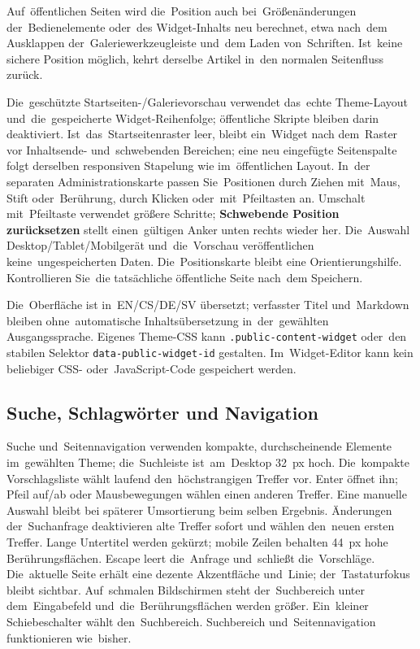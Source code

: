 \documentclass[11pt,a4paper]{article}
\newcommand{\ui}[1]{\textbf{#1}}
\begin{document}
Auf~öffentlichen Seiten wird die~Position auch bei~Größenänderungen
der~Bedienelemente oder~des Widget-Inhalts neu berechnet, etwa nach~dem
Ausklappen der~Galeriewerkzeugleiste und~dem Laden von~Schriften. Ist~keine
sichere Position möglich, kehrt derselbe Artikel in~den normalen Seitenfluss
zurück.

Die~geschützte Startseiten-/Galerievorschau verwendet das~echte Theme-Layout
und~die~gespeicherte Widget-Reihenfolge; öffentliche Skripte bleiben darin
deaktiviert. Ist~das~Startseitenraster leer, bleibt ein~Widget nach dem~Raster
vor Inhaltsende- und~schwebenden Bereichen; eine neu eingefügte Seitenspalte
folgt derselben responsiven Stapelung wie im~öffentlichen Layout. In~der
separaten Administrationskarte passen Sie~Positionen durch Ziehen mit~Maus,
Stift oder~Berührung, durch Klicken oder~mit~Pfeiltasten an. Umschalt
mit~Pfeiltaste verwendet größere Schritte; \ui{Schwebende Position zurücksetzen}
stellt einen~gültigen Anker unten rechts wieder her. Die~Auswahl
Desktop/Tablet/Mobilgerät und~die~Vorschau veröffentlichen keine~ungespeicherten
Daten. Die~Positionskarte bleibt eine Orientierungshilfe. Kontrollieren Sie~die
tatsächliche öffentliche Seite nach~dem Speichern.

Die~Oberfläche ist in~EN/CS/DE/SV übersetzt; verfasster Titel und~Markdown
bleiben ohne~automatische Inhaltsübersetzung in~der~gewählten Ausgangssprache.
Eigenes Theme-CSS kann \texttt{.public-content-widget} oder~den stabilen
Selektor \texttt{data-public-widget-id} gestalten. Im~Widget-Editor kann kein
beliebiger CSS- oder~JavaScript-Code gespeichert werden.


\subsection{Suche, Schlagwörter und Navigation}

Suche und~Seitennavigation verwenden kompakte, durchscheinende Elemente
im~gewählten Theme; die~Suchleiste ist~am~Desktop 32~px hoch.
Die~kompakte Vorschlagsliste wählt laufend den~höchstrangigen Treffer vor.
Enter öffnet ihn; Pfeil auf/ab oder Mausbewegungen wählen einen anderen
Treffer. Eine manuelle Auswahl bleibt bei späterer Umsortierung beim selben
Ergebnis. Änderungen der~Suchanfrage deaktivieren alte Treffer sofort und
wählen den~neuen ersten Treffer. Lange Untertitel werden gekürzt;
mobile Zeilen behalten 44~px hohe Berührungsflächen.
Escape leert die~Anfrage und~schließt die~Vorschläge.
Die~aktuelle Seite erhält eine dezente Akzentfläche
und~Linie; der~Tastaturfokus bleibt sichtbar. Auf~schmalen Bildschirmen steht
der~Suchbereich unter dem~Eingabefeld und~die~Berührungsflächen werden größer.
Ein~kleiner Schiebeschalter wählt den~Suchbereich.
Suchbereich und~Seitennavigation funktionieren wie~bisher.
\end{document}
